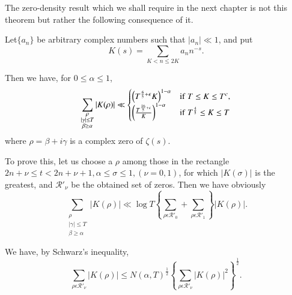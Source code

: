  The zero-density result which we shall require in the  next chapter
 is not this theorem but rather the following consequence of it. 
\begin{Lemma}\label{chap5-lem25}
Let\pageoriginale $\{a_n\}$ be arbitrary complex numbers such that
$|a_n | \ll  1$, and put  
   $$
   K(s) = \sum_{K < n \leq 2K} a_n n^{-s}.
   $$

   Then we have,  for  $0 \leq \alpha \leq 1$,
   $$
   \sum_{\substack{\rho \\ |\gamma | \leq T \\ \beta \geq \alpha}} |K (\rho)| \ll
   \begin{cases}
     \left(T^{\frac{6}{5}+ \epsilon  } K\right)^{1-\alpha} & {\rm
       if}~ T \leq K \leq T^c,\\ 
     \left(\frac{T^{\frac{16}{5}+ \epsilon }}{K}\right)^{1- \alpha} & {\rm if}~
     T^{\frac{4}{5}} \leq K \leq T 
   \end{cases} 
   $$
   where $\rho = \beta + i \gamma$ is a complex zero of $\zeta (s)$. 
 \end{Lemma}

To prove this, let us choose a $\rho $ among those in the rectangle
$2n + \nu \leq t < 2n + \nu +1, \alpha \leq \sigma \leq 1, (\nu =
0,1)$, for which $|K(\sigma)|$ is the greatest, and $\mathscr{R}'_\nu$
be the obtained set of zeros. Then we have obviously 
$$
 \sum_{\substack{\rho \\ |\gamma | \leq T \\ \beta \geq \alpha}} |K
 (\rho)| \ll \log T \left\{ \sum_{\rho \epsilon  \mathscr{R'}_0} + \sum_{\rho
   \epsilon  \mathscr{R'}_1}\right\} |K (\rho )|. 
$$

We have, by Schwarz's inequality,
$$
  \sum_{\rho \epsilon  \mathscr{R'}_{\nu}} |K(\rho )|  \leq N(\alpha
,  T)^{\frac{1}{2}} \left\{ \sum_{\rho \epsilon  \mathscr{R'}_\nu}
  |K(\rho)|^2 \right\}^{\frac{1}{2}}.
$$

